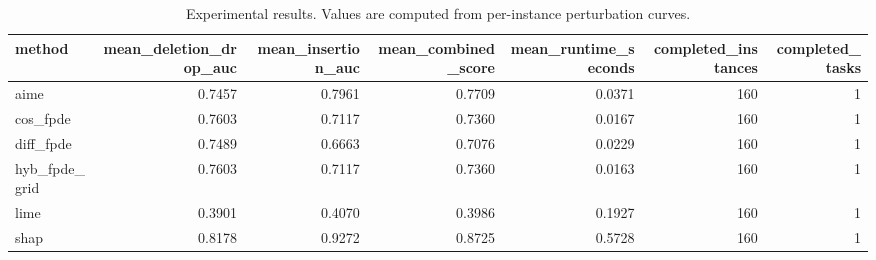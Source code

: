 \begin{table}[t]
\caption{Experimental results. Values are computed from per-instance perturbation curves.}
\label{tab:main_results_computed}
\centering
\begin{tabular}{lrrrrrr}
\toprule
method & mean\_deletion\_drop\_auc & mean\_insertion\_auc & mean\_combined\_score & mean\_runtime\_seconds & completed\_instances & completed\_tasks \\
\midrule
aime & 0.7457 & 0.7961 & 0.7709 & 0.0371 & 160 & 1 \\
cos\_fpde & 0.7603 & 0.7117 & 0.7360 & 0.0167 & 160 & 1 \\
diff\_fpde & 0.7489 & 0.6663 & 0.7076 & 0.0229 & 160 & 1 \\
hyb\_fpde\_grid & 0.7603 & 0.7117 & 0.7360 & 0.0163 & 160 & 1 \\
lime & 0.3901 & 0.4070 & 0.3986 & 0.1927 & 160 & 1 \\
shap & 0.8178 & 0.9272 & 0.8725 & 0.5728 & 160 & 1 \\
\bottomrule
\end{tabular}

\end{table}
